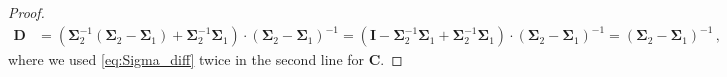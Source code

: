 \documentclass[a4paper]{article}
\newcommand{\bs}[1]{{\boldsymbol{#1}}}
\theoremstyle{definition}
\begin{document}
\begin{proof}
\begin{align*}
        \bs{D} & = \left( \bs{\Sigma}^{-1}_2 \left( \bs{\Sigma}_2 - \bs{\Sigma}_1 \right) + \bs{\Sigma}^{-1}_2 \bs{\Sigma}_1 \right) \cdot \left( \bs{\Sigma}_2 - \bs{\Sigma}_1 \right)^{-1} = \left( \mathbf{I} - \bs{\Sigma}^{-1}_2 \bs{\Sigma}_1 + \bs{\Sigma}^{-1}_2 \bs{\Sigma}_1 \right) \cdot \left( \bs{\Sigma}_2 - \bs{\Sigma}_1 \right)^{-1} = \left( \bs{\Sigma}_2 - \bs{\Sigma}_1 \right)^{-1} \,,
    \end{align*}
    where we used \eqref{eq:Sigma_diff} twice in the second line for $\bs{C}$.
\end{proof}
\end{document}
